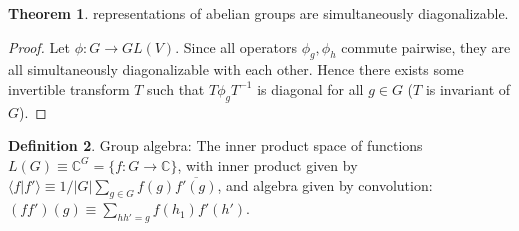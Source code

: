 \documentclass{book}
\newcommand{\C}{\ensuremath{\mathbb{C}}}
\theoremstyle{definition}
\newtheorem{theorem}{Theorem}
\newtheorem{definition}[theorem]{Definition}
\begin{document}
\begin{theorem}
representations of abelian groups are simultaneously diagonalizable.
\end{theorem}
\begin{proof}
Let $\phi: G \rightarrow GL(V)$. Since all operators $\phi_g, \phi_h$ commute
pairwise, they are all simultaneously diagonalizable with each other. Hence
there exists some invertible transform $T$ such that $T \phi_g T^{-1}$ is
diagonal for all $g \in G$ ($T$ is invariant of $G$).
\end{proof}

\begin{definition}
Group algebra: The inner product space of functions $L(G) \equiv \mathbb C^G = \{ f: G \rightarrow \C \}$,
with inner product given by $\langle f | f' \rangle \equiv  1/|G|\sum_{g \in G} f(g) \overline{f'(g)}$,
and algebra given by convolution: $(f f')(g) \equiv \sum_{hh' = g}f(h_1)f'(h')$.
\end{definition}
\end{document}
